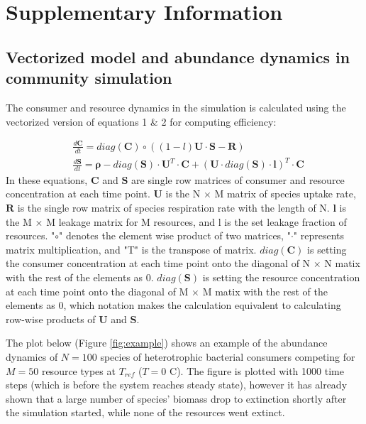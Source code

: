 

\renewcommand{\thefigure}{SI.\arabic{figure}}
\setcounter{figure}{0}

\section*{Supplementary Information}\label{sec:SI}

\renewcommand{\thesubsection}{SI.\arabic{subsection}}
\setcounter{subsection}{0}

\subsection{Vectorized model and abundance dynamics in community simulation}

The consumer and resource dynamics in the simulation is calculated using the vectorized version of equations 1 \& 2 for computing efficiency: 

\begin{align*}
&\frac{d\mathbf{C}}{dt} = diag(\mathbf{C}) \circ ((1-l) \mathbf{U} \cdot \mathbf{S} - \mathbf{R})\\
&\frac{d\mathbf{S}}{dt} = \boldsymbol{\rho} - diag(\mathbf{S})\cdot \mathbf{U}^T \cdot \mathbf{C} + (\mathbf{U} \cdot diag(\mathbf{S}) \cdot \mathbf{l})^T \cdot \mathbf{C}
\end{align*}
In these equations, $\mathbf{C}$ and $\mathbf{S}$ are single row matrices of consumer and resource concentration at each time point. $\mathbf{U}$ is the N $\times$ M matrix of species uptake rate, $\mathbf{R}$ is the single row matrix of species respiration rate with the length of N. $\mathbf{l}$ is the M $\times$ M leakage matrix for M resources, and l is the set leakage fraction of resources. "$\circ$" denotes the element wise product of two matrices, "$\cdot$" represents matrix multiplication, and "T" is the transpose of matrix. $diag(\mathbf{C})$ is setting the consumer concentration at each time point onto the diagonal of N $\times$ N matix with the rest of the elements as 0. $diag(\mathbf{S})$ is setting the resource concentration at each time point onto the diagonal of M $\times$ M matix with the rest of the elements as 0, which notation makes the calculation equivalent to calculating row-wise products of $\mathbf{U}$ and $\mathbf{S}$. 

The plot below (Figure \ref{fig:example}) shows an example of the abundance dynamics of $N = 100$ species of heterotrophic bacterial consumers competing for $M = 50$ resource types at $T_{ref}$ ($T = 0$ \textdegree C). The figure is plotted with 1000 time steps (which is before the system reaches steady state), however it has already shown that a large number of species' biomass drop to extinction shortly after the simulation started, while none of the resources went extinct.


